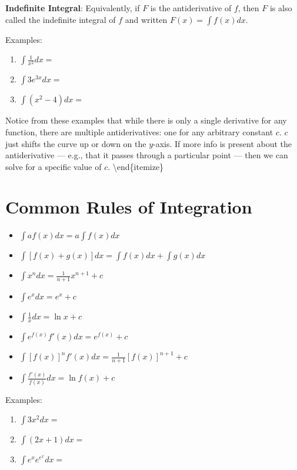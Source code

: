 \documentclass[]{book}
\theoremstyle{definition}
\theoremstyle{definition}
\theoremstyle{definition}
\theoremstyle{remark}
\begin{document}
\textbf{Indefinite Integral}: Equivalently, if \(F\) is the
antiderivative of \(f\), then \(F\) is also called the indefinite
integral of \(f\) and written \(F(x)=\int\limits f(x)dx\).

\begin{framed}
Examples:
    \parbox[c]{3.75in}{
    \begin{enumerate}
        \item $\int\limits \frac{1}{x^2}dx=$
        \item $\int\limits 3e^{3x}dx=$
        \item $\int\limits (x^2-4) dx=$
    \end{enumerate}}
\begin{comment}
\parbox[c]{1in}{\,  {\texttt{[image: derinteg.eps]}}}
\end{comment}
\end{framed}

Notice from these examples that while there is only a single derivative
for any function, there are multiple antiderivatives: one for any
arbitrary constant \(c\). \(c\) just shifts the curve up or down on the
\(y\)-axis. If more info is present about the antiderivative --- e.g.,
that it passes through a particular point --- then we can solve for a
specific value of \(c\). \textbackslash{}end\{itemize\}

\section{Common Rules of Integration}\label{common-rules-of-integration}

\begin{itemize}
\item $\int a f(x)dx = a\int f(x)dx$
\item $\int [f(x)+g(x)]dx=\int f(x)dx + \int g(x)dx$
\item $\int x^n dx = \frac{1}{n+1} x^{n+1} + c $
\item $\int e^x dx = e^x +c$
\item $\int \frac{1}{x} dx = \ln x + c$
\item $\int e^{f(x)}f'(x)dx = e^{f(x)}+c$
\item $\int [f(x)]^n f'(x)dx = \frac{1}{n+1}[f(x)]^{n+1}+c$
\item $\int \frac{f'(x)}{f(x)}dx=\ln f(x) + c$
\end{itemize}

\begin{framed}
Examples:
\begin{enumerate}
    \item $\int 3x^2 dx= $
    \item $\int (2x+1)dx=$
    \item $\int e^x e^{e^x} dx = $
\end{enumerate}
\end{framed}
\end{document}
